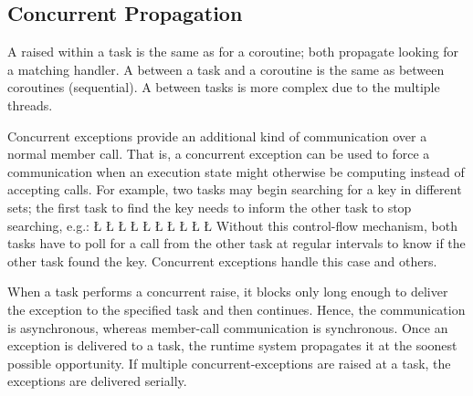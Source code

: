 \documentclass[openright,twoside]{report}
\begin{document}
\subsection{Concurrent Propagation}
\label{s:ConcurrentPropagation}

A  raised within a task is the same as for a coroutine;
both propagate looking for a matching handler.
A  between a task and a coroutine is the same as between coroutines (sequential).
A  between tasks is more complex due to the multiple threads.

Concurrent exceptions provide an additional kind of communication over a normal member call.
That is, a concurrent exception can be used to force a communication when an execution state might otherwise be computing instead of accepting calls.
For example, two tasks may begin searching for a key in different sets;
the first task to find the key needs to inform the other task to stop searching, e.g.:
\LGinlinefalse\LGbegin\lgrinde
\L{}
\L{\LB{}}
\CE{}\L{\LB{}}
\L{\LB{}}
\L{\LB{}}
\L{\LB{}}
\CE{}\L{\LB{}}
\L{\LB{}}
\CE{}\L{\LB{}}
\L{\LB{}}
\endlgrinde\LGend
Without this control-flow mechanism, both tasks have to poll for a call from the other task at regular intervals to know if the other task found the key.
Concurrent exceptions handle this case and others.

When a task performs a concurrent raise, it blocks only long enough to deliver the exception to the specified task and then continues.
Hence, the communication is asynchronous, whereas member-call communication is synchronous.
Once an exception is delivered to a task, the runtime system propagates it at the soonest possible opportunity.
If multiple concurrent-exceptions are raised at a task, the exceptions are delivered serially.
\end{document}
